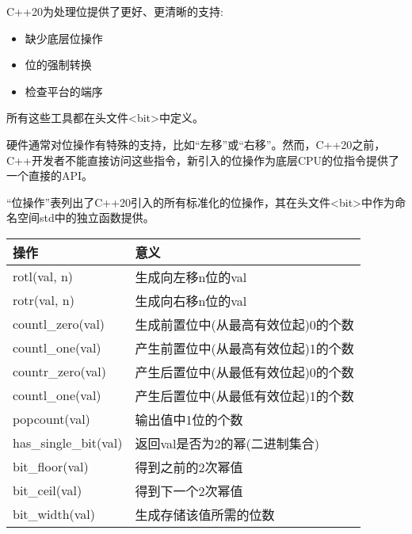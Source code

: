 
C++20为处理位提供了更好、更清晰的支持:

\begin{itemize}
\item 
缺少底层位操作

\item 
位的强制转换

\item 
检查平台的端序
\end{itemize}

所有这些工具都在头文件<bit>中定义。


硬件通常对位操作有特殊的支持，比如“左移”或“右移”。然而，C++20之前，C++开发者不能直接访问这些指令，新引入的位操作为底层CPU的位指令提供了一个直接的API。

“位操作”表列出了C++20引入的所有标准化的位操作，其在头文件<bit>中作为命名空间std中的独立函数提供。

\begin{longtable}[c]{|l|l|}
\hline
\textbf{操作}    & \textbf{意义}                                    \\ \hline
\endfirsthead
%
\endhead
%
rotl(val, n)          & 生成向左移n位的val          \\ \hline
rotr(val, n)          & 生成向右移n位的val         \\ \hline
countl\_zero(val)     & 生成前置位中(从最高有效位起)0的个数   \\ \hline
countl\_one(val)      & 产生前置位中(从最高有效位起)1的个数   \\ \hline
countr\_zero(val)     & 产生后置位中(从最低有效位起)0的个数 \\ \hline
countl\_one(val)      & 产生后置位中(从最低有效位起)1的个数 \\ \hline
popcount(val)         & 输出值中1位的个数                \\ \hline
has\_single\_bit(val) & 返回val是否为2的幂(二进制集合)    \\ \hline
bit\_floor(val)       & 得到之前的2次幂值                  \\ \hline
bit\_ceil(val)        & 得到下一个2次幂值                      \\ \hline
bit\_width(val)       & 生成存储该值所需的位数  \\ \hline
\end{longtable}

